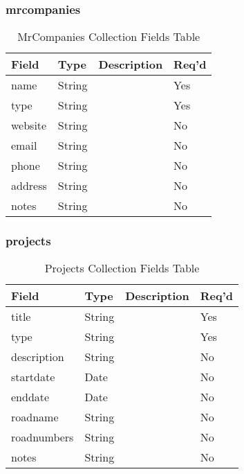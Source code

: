 \subsubsection{mrcompanies}
\begin{table}[H]
    \begin{tabular}{|L{3cm}|L{1.7cm}|L{8.8cm}|L{1.3cm}|}
    \hline
        \textbf{Field} & \textbf{Type} & \textbf{Description} & \textbf{Req'd} \\ \hline
	name & String &  & Yes \\ \hline
	type & String &  & Yes \\ \hline
	website & String &  & No \\ \hline
	email & String &  & No \\ \hline
	phone & String &  & No \\ \hline
	address & String &  & No \\ \hline
	notes & String &  & No \\ \hline
    \end{tabular}
    \caption{\label{mrcompany-table}MrCompanies Collection Fields Table}
    \end{table}
\subsubsection{projects}
\begin{table}[H]
    \begin{tabular}{|L{3cm}|L{1.7cm}|L{8.8cm}|L{1.3cm}|}
    \hline
        \textbf{Field} & \textbf{Type} & \textbf{Description} & \textbf{Req'd} \\ \hline
	title & String &  & Yes \\ \hline
	type & String &  & Yes \\ \hline
	description & String &  & No \\ \hline
	startdate & Date &  & No \\ \hline
	enddate & Date &  & No \\ \hline
	roadname & String &  & No \\ \hline
	roadnumbers & String &  & No \\ \hline
	notes & String &  & No \\ \hline
    \end{tabular}
    \caption{\label{project-table}Projects Collection Fields Table}
    \end{table}
